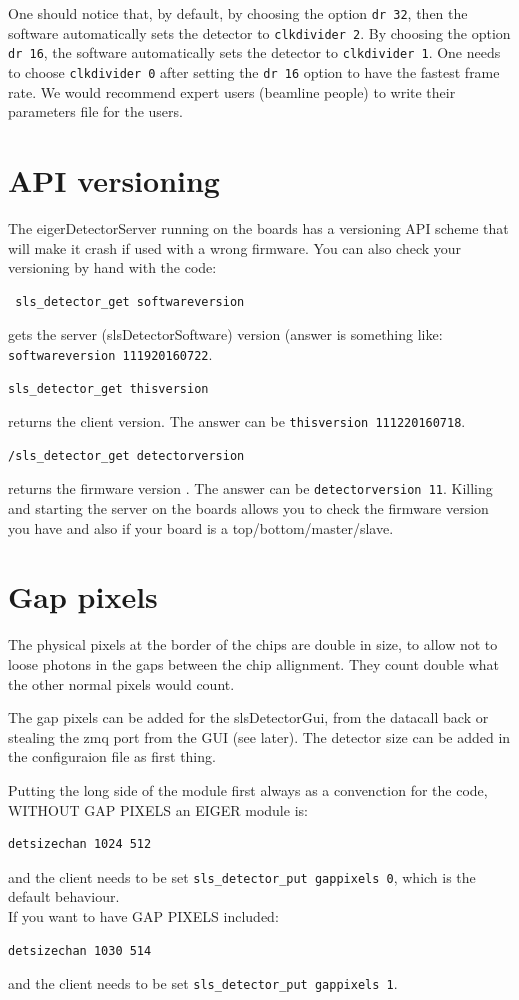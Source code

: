 \documentclass{article}
\begin{document}
One should notice that, by default, by choosing the option {\tt{dr 32}}, then the software automatically sets the detector to  {\tt{clkdivider 2}}. By choosing the option {\tt{dr 16}}, the software automatically sets the detector to  {\tt{clkdivider 1}}. One needs to choose {\tt{clkdivider 0}} after setting the {\tt{dr 16}} option to have the fastest frame rate. 
We would recommend expert users (beamline people) to write their parameters file for the users. 

\section{API versioning} \label{api}
The eigerDetectorServer running on the boards has a versioning API scheme that will make it crash if used with a wrong firmware.
You can also check your versioning by hand with the code:
\begin{verbatim}
 sls_detector_get softwareversion
\end{verbatim}
gets the server (slsDetectorSoftware) version (answer is something like: {\tt{softwareversion 111920160722}}.
 \begin{verbatim}
sls_detector_get thisversion 
\end{verbatim}
returns the client version. The answer can be {\tt{thisversion 111220160718}}.
\begin{verbatim}
/sls_detector_get detectorversion
\end{verbatim}
returns the firmware version . The answer can be {\tt{detectorversion 11}}.
Killing and starting the server on the boards allows you to check the firmware version you have and also if your board is a top/bottom/master/slave.

\section{Gap pixels}
The physical pixels at the border of the chips are double in size, to allow not to loose photons in the gaps between the chip allignment. They count double what the other normal pixels would count. 

The gap pixels can be added for the slsDetectorGui, from the datacall back or stealing the zmq port from the GUI (see later). The detector size can be added in the configuraion file as first thing. 

Putting the long side of the module first always as a convenction for the code, WITHOUT GAP PIXELS an EIGER module is:
\begin{verbatim}
detsizechan 1024 512 
\end{verbatim}
and the client needs to be set {\tt{sls\_detector\_put  gappixels 0}}, which is the default behaviour.\\
If you want to have GAP PIXELS included: 
\begin{verbatim}
detsizechan 1030 514 
\end{verbatim}
and the client needs to be set {\tt{sls\_detector\_put  gappixels 1}}.
\end{document}

